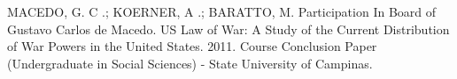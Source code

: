

\begin{cvcitems}

\cvcitem
    {MACEDO, G. C .; KOERNER, A .; BARATTO, M.}
    {Participation In Board of Gustavo Carlos de Macedo. US Law of War: A Study of the Current Distribution of War Powers in the United States. 2011. Course Conclusion Paper (Undergraduate in Social Sciences) - State University of Campinas.}
        
\end{cvcitems}
